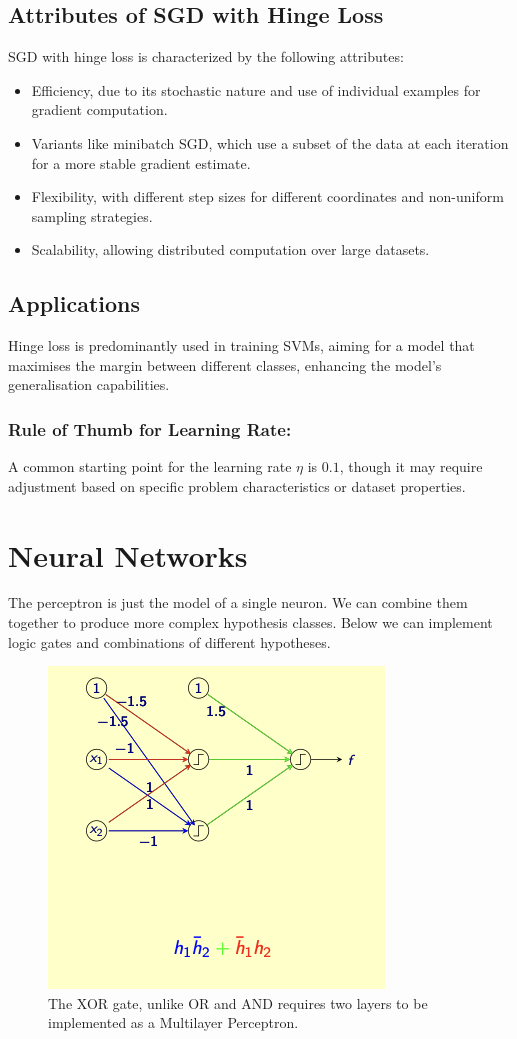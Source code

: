 \subsection*{Attributes of SGD with Hinge Loss}
SGD with hinge loss is characterized by the following attributes:
\begin{itemize}
    \item Efficiency, due to its stochastic nature and use of individual examples for gradient computation.
    \item Variants like minibatch SGD, which use a subset of the data at each iteration for a more stable gradient estimate.
    \item Flexibility, with different step sizes for different coordinates and non-uniform sampling strategies.
    \item Scalability, allowing distributed computation over large datasets.
\end{itemize}

\subsection*{Applications}
Hinge loss is predominantly used in training SVMs, aiming for a model that maximises the margin between different classes, enhancing the model's generalisation capabilities.

\subsubsection*{Rule of Thumb for Learning Rate:}
A common starting point for the learning rate $\eta$ is $0.1$, though it may require adjustment based on specific problem characteristics or dataset properties.

\section{Neural Networks}

The perceptron is just the model of a single neuron. We can combine them together to produce more complex hypothesis classes. Below we can implement logic gates and combinations of different hypotheses.

\begin{figure}[H]
    \centering
    \includegraphics[width=0.5\linewidth]{img/XORMLP.png}
    \caption{The XOR gate, unlike OR and AND requires two layers to be implemented as a Multilayer Perceptron.}
\end{figure}

